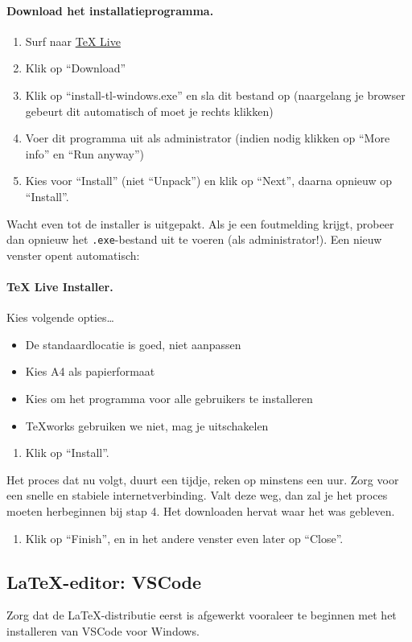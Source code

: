 \documentclass[kulak]{kulakarticle} %
\begin{document}
\paragraph{Download het installatieprogramma.}
\begin{enumerate}
	\item Surf naar \href{http://www.tug.org/texlive/}{TeX Live}
	\item Klik op ``Download''
	\item Klik op ``install-tl-windows.exe'' en sla dit bestand op (naargelang je browser gebeurt dit automatisch of moet je rechts klikken)
	\item Voer dit programma uit als administrator (indien nodig klikken op ``More info'' en ``Run anyway'')
	\item Kies voor ``Install'' (niet ``Unpack'') en klik op ``Next'', daarna opnieuw op ``Install''.
\end{enumerate}
Wacht even tot de installer is uitgepakt. Als je een foutmelding krijgt, probeer dan opnieuw het \texttt{.exe}-bestand uit te voeren (als administrator!). Een nieuw venster  opent automatisch:
\paragraph{TeX Live Installer.} Kies volgende opties\ldots
\begin{itemize}
	\item De standaardlocatie is goed, niet aanpassen
	\item Kies A4 als papierformaat
	\item Kies om het programma voor alle gebruikers te installeren
	\item TeXworks gebruiken we niet, mag je uitschakelen
\end{itemize}
\begin{enumerate}[resume]
	\item Klik op ``Install''.
\end{enumerate}
Het proces dat nu volgt, duurt een tijdje, reken op minstens een uur. Zorg voor een snelle en stabiele internetverbinding. Valt deze weg, dan zal je het proces moeten herbeginnen bij stap 4. Het downloaden hervat waar het was gebleven.
\begin{enumerate}[resume]
	\item Klik op ``Finish'', en in het andere venster even later op ``Close''.
\end{enumerate}

\subsection{\LaTeX-editor: VSCode}
Zorg dat de \LaTeX-distributie eerst is afgewerkt vooraleer te beginnen met het installeren van VSCode voor Windows.
\end{document}
